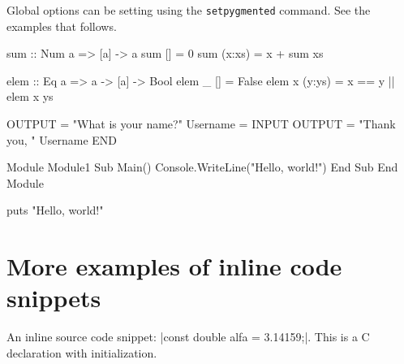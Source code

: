 \documentclass[10pt,a4paper]{article}
\begin{document}
Global options can be setting using the \verb|setpygmented| command.
See the examples that follows.

\begin{Example}

\begin{pygmented}[]
sum :: Num a => [a] -> a
sum [] = 0
sum (x:xs) = x + sum xs
\end{pygmented}
\end{Example}

\begin{Example}
\begin{pygmented}[colback=blue!20, boxing method=tcolorbox]
elem :: Eq a => a -> [a] -> Bool
elem _ [] = False
elem x (y:ys) = x == y || elem x ys
\end{pygmented}
\end{Example}

\begin{Example}

\begin{pygmented}[]
          OUTPUT = "What is your name?"
          Username = INPUT
          OUTPUT = "Thank you, " Username
END
\end{pygmented}
\end{Example}

\begin{Example}

\begin{pygmented}[test, lang=vbnet]
Module Module1
    Sub Main() 
        Console.WriteLine("Hello, world!")
    End Sub
End Module
\end{pygmented}
\end{Example}

\begin{Example}
\begin{pygmented}[lang=tcl]
puts "Hello, world!"
\end{pygmented}
\end{Example}

\section{More examples of inline code snippets}

\begin{Example}
  An inline source code snippet:
  \pyginline[lang=c]|const double alfa = 3.14159;|.
  This is a C declaration with initialization.
\end{Example}
\end{document}

